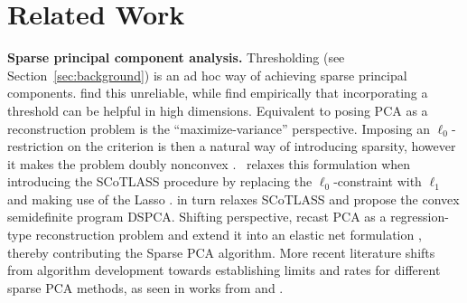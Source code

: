 \documentclass{article}
\begin{document}
\section{Related Work}
\textbf{Sparse principal component analysis.} Thresholding (see Section~\ref{sec:background}) is an ad hoc way of achieving sparse principal components. \cite{cadimaLoadingCorrelationsInterpretation1995} find this unreliable, while \cite{johnstone_consistency_2009} find empirically that incorporating a threshold can be helpful in high dimensions. Equivalent to posing PCA as a reconstruction problem is the ``maximize-variance'' perspective. Imposing an $\ell_0$-restriction on the criterion is then a natural way of introducing sparsity, however it makes the problem doubly nonconvex \cite[ch.~8.2]{hastie_statistical_2015}. \cite{jolliffe_modified_2003}~relaxes this formulation when introducing the SCoTLASS procedure by replacing the $\ell_0$-constraint with $\ell_1$ and making use of the Lasso \cite{tibshirani_regression_1996}. \cite{df537581-8346-3a06-a12b-234347a76196} in turn relaxes SCoTLASS and propose the convex semidefinite program DSPCA. Shifting perspective, \cite{zou_sparse_2006} recast PCA as a regression-type reconstruction problem and extend it into an elastic net formulation \cite{zou_regularization_2005}, thereby contributing the Sparse PCA algorithm. More recent literature shifts from algorithm development towards establishing limits and rates for different sparse PCA methods, as seen in works from \cite{deshpande_information-theoretically_2014} and \cite{cai_sparse_2013}.
\end{document}
